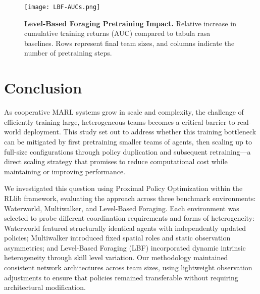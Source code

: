 \documentclass{article}
\begin{document}
\begin{figure}[h]
    \centering
    \texttt{[image: LBF-AUCs.png]}
    \caption{\textbf{Level-Based Foraging Pretraining Impact.} 
    Relative increase in cumulative training returns (AUC) compared to tabula rasa baselines. 
    Rows represent final team sizes, and columns indicate the number of pretraining steps.}
    \label{fig:lbf-aucs}
\end{figure}

\FloatBarrier

\section{Conclusion}

As cooperative MARL systems grow in scale and complexity, the challenge of efficiently 
training large, heterogeneous teams becomes a critical barrier to real-world deployment. 
This study set out to address whether this training bottleneck can be mitigated by 
first pretraining smaller teams of agents, then scaling up to full-size configurations 
through policy duplication and subsequent retraining—a direct scaling strategy that 
promises to reduce computational cost while maintaining or improving performance.

We investigated this question using Proximal Policy Optimization within the 
RLlib framework, evaluating the approach across three benchmark environments: 
Waterworld, Multiwalker, and Level-Based Foraging. Each environment was 
selected to probe different coordination requirements and forms of heterogeneity: 
Waterworld featured structurally identical agents with independently updated policies; 
Multiwalker introduced fixed spatial roles and static observation asymmetries; 
and Level-Based Foraging (LBF) incorporated dynamic intrinsic heterogeneity through 
skill level variation. Our methodology maintained consistent network architectures across 
team sizes, using lightweight observation adjustments to ensure that policies remained 
transferable without requiring architectural modification.
\end{document}
